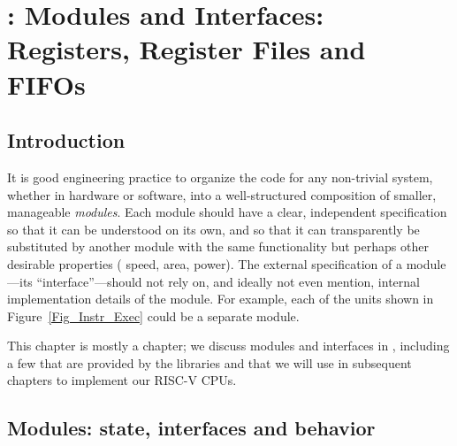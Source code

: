 

\chapter{{\BSV}: Modules and Interfaces: Registers, Register Files and FIFOs}


\setcounter{page}{1}
\renewcommand{\thepage}{\arabic{chapter}-\arabic{page}}

\label{ch_Modules_and_Interfaces}


\section{Introduction}

It is good engineering practice to organize the code for any
non-trivial system, whether in hardware or software, into a
well-structured composition of smaller, manageable \emph{modules}.
Each module should have a clear, independent specification so that it
can be understood on its own, and so that it can transparently be
substituted by another module with the same functionality but perhaps
other desirable properties ({\eg} speed, area, power).  The external
specification of a module---its ``interface''---should not rely on,
and ideally not even mention, internal implementation details of the
module.  For example, each of the units shown in
Figure~\ref{Fig_Instr_Exec} could be a separate module.

This chapter is mostly a {\BSV} chapter; we discuss modules and
interfaces in {\BSV}, including a few that are provided by the {\BSV}
libraries and that we will use in subsequent chapters to implement our
RISC-V CPUs.


\section{Modules: state, interfaces and behavior}

\label{Sec_Modules}


